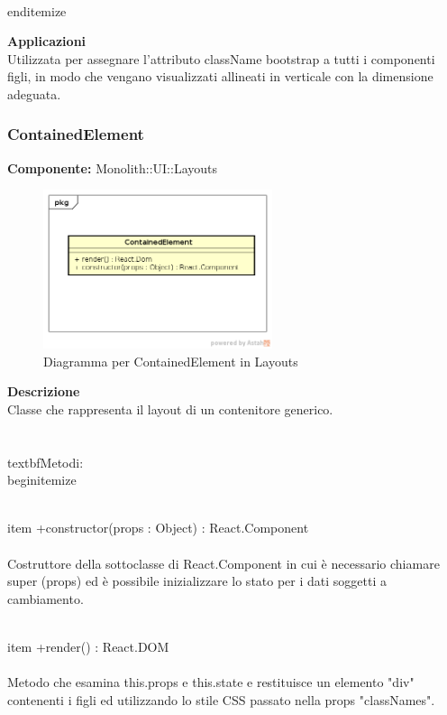 \\end{itemize} 


\textbf{Applicazioni}\\
Utilizzata per assegnare l'attributo className bootstrap a tutti i componenti figli, in modo che vengano visualizzati allineati in verticale con la dimensione adeguata. 


\clearpage

\subsubsection{ContainedElement}
\textbf{Componente:}  Monolith::UI::Layouts\\
   \FloatBarrier
   \begin{figure}[ht]
   \centering
   \includegraphics[width=0.6\textwidth]{img/single-ContainedElement}
   \caption{{Diagramma per ContainedElement in Layouts}}
\end{figure}
\FloatBarrier
\textbf{Descrizione}\\
Classe che rappresenta il layout di un contenitore generico. \\\\
\\textbf{Metodi:} 
\\begin{itemize}

\\item +constructor(props : Object) : React.Component 
\\\\
Costruttore della sottoclasse di React.Component in cui è necessario chiamare super (props) ed è possibile inizializzare lo stato per i dati soggetti a cambiamento.

\\item +render() : React.DOM 
\\\\
Metodo che esamina this.props e this.state e restituisce un elemento "div" contenenti i figli ed utilizzando lo stile CSS passato nella props "classNames".

